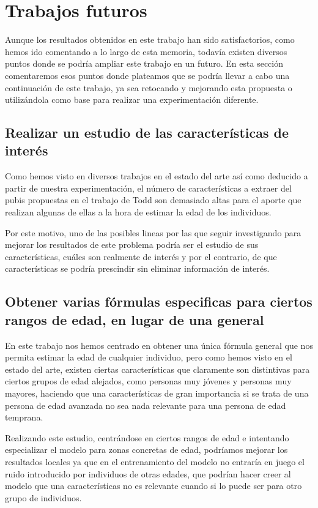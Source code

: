 \section{Trabajos futuros}

Aunque los resultados obtenidos en este trabajo han sido satisfactorios, como hemos ido comentando a lo largo de esta memoria, todavía existen diversos puntos donde se podría ampliar este trabajo en un futuro. En esta sección comentaremos esos puntos donde plateamos que se podría llevar a cabo una continuación de este trabajo, ya sea retocando y mejorando esta propuesta o utilizándola como base para realizar una experimentación diferente.

\subsection{Realizar un estudio de las características de interés}

Como hemos visto en diversos trabajos en el estado del arte así como deducido a partir de nuestra experimentación, el número de características a extraer del pubis propuestas en el trabajo de Todd son demasiado altas para el aporte que realizan algunas de ellas a la hora de estimar la edad de los individuos.

Por este motivo, uno de las posibles lineas por las que seguir investigando para mejorar los resultados de este problema podría ser el estudio de sus características, cuáles son realmente de interés y por el contrario, de que características se podría prescindir sin eliminar información de interés.

\subsection{Obtener varias fórmulas especificas para ciertos rangos de edad, en lugar de una general}

En este trabajo nos hemos centrado en obtener una única fórmula general que nos permita estimar la edad de cualquier individuo, pero como hemos visto en el estado del arte, existen ciertas características que claramente son distintivas para ciertos grupos de edad alejados, como personas muy jóvenes y personas muy mayores, haciendo que una características de gran importancia si se trata de una persona de edad avanzada no sea nada relevante para una persona de edad temprana.

Realizando este estudio, centrándose en ciertos rangos de edad e intentando especializar el modelo para zonas concretas de edad, podríamos mejorar los resultados locales ya que en el entrenamiento del modelo no entraría en juego el ruido introducido por individuos de otras edades, que podrían hacer creer al modelo que una características no es relevante cuando si lo puede ser para otro grupo de individuos.

